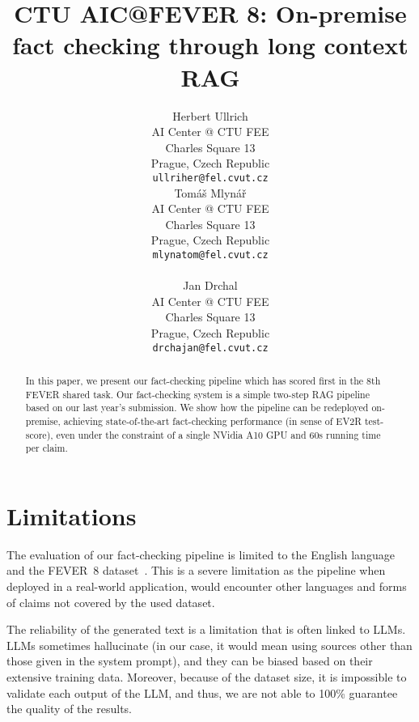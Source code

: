 \documentclass[11pt]{article}
\title{CTU AIC@FEVER 8: On-premise fact checking through long context RAG}
\author{Herbert Ullrich \\
AI Center @ CTU FEE\\
Charles Square 13\\
Prague, Czech Republic\\
\texttt{ullriher@fel.cvut.cz} \\\And
Tomáš Mlynář \\
AI Center @ CTU FEE\\
Charles Square 13\\
Prague, Czech Republic\\
\texttt{mlynatom@fel.cvut.cz} \\ \\\And
Jan Drchal \\
AI Center @ CTU FEE\\
Charles Square 13\\
Prague, Czech Republic\\
\texttt{drchajan@fel.cvut.cz} \\}
\newcommand{\averitec}{FEVER~8}
\begin{document}
{\makeatletter\acl@finalcopytrue
  \maketitle
}
\begin{abstract}
In this paper, we present our fact-checking pipeline which has scored first in the 8th FEVER shared task. Our fact-checking system is a simple two-step RAG pipeline based on our last year's submission. We show how the pipeline can be redeployed on-premise, achieving state-of-the-art fact-checking performance (in sense of EV2R test-score), even under the constraint of a single NVidia A10 GPU and 60s running time per claim.

\end{abstract}



%

%


\section*{Limitations}
The evaluation of our fact-checking pipeline is limited to the English language and the \averitec{} dataset~\cite{averitec2024}. This is a severe limitation as the pipeline when deployed in a real-world application, would encounter other languages and forms of claims not covered by the used dataset.


The reliability of the generated text is a limitation that is often linked to LLMs. LLMs sometimes hallucinate (in our case, it would mean using sources other than those given in the system prompt), and they can be biased based on their extensive training data. Moreover, because of the dataset size, it is impossible to validate each output of the LLM, and thus, we are not able to 100\% guarantee the quality of the results.
\end{document}
